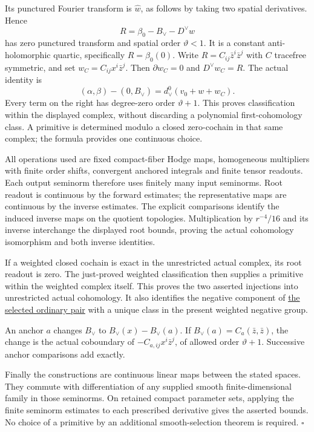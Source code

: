 \documentclass[
  english,
  11pt,
  reqno]{amsart}
\begin{document}
Its punctured Fourier transform is \(\widehat w\), as follows by taking
two spatial derivatives. Hence%
 \[
R=\beta_0-B_\vee-D^\vee w
\] has zero punctured transform and spatial order \(\vartheta<1\). It is
a constant anti-holomorphic quartic, specifically \(R=\beta_0(0)\).
Write \(R=C_{ij}\bar z^i\bar z^j\) with \(C\) tracefree symmetric, and
set \(w_C=C_{ij}x^i\bar z^j\). Then \(\partial w_C=0\) and
\(D^\vee w_C=R\). The actual identity is%
 \[
(\alpha,\beta)-(0,B_\vee)
=d_\vee^0(v_0+w+w_C).
\] Every term on the right has degree-zero order \(\vartheta+1\). This
proves classification within the displayed complex, without discarding a
polynomial first-cohomology class. A primitive is determined modulo a
closed zero-cochain in that same complex; the formula provides one
continuous choice.

All operations used are fixed compact-fiber Hodge maps, homogeneous
multipliers with finite order shifts, convergent anchored integrals and
finite tensor readouts. Each output seminorm therefore uses finitely
many input seminorms. Root readout is continuous by the forward
estimates; the representative maps are continuous by the inverse
estimates. The explicit comparisons identify the induced inverse maps on
the quotient topologies. Multiplication by \(r^{-4}/16\) and its inverse
interchange the displayed root bounds, proving the actual cohomology
isomorphism and both inverse identities.

If a weighted closed cochain is exact in the unrestricted actual
complex, its root readout is zero. The just-proved weighted
classification then supplies a primitive within the weighted complex
itself. This proves the two asserted injections into unrestricted actual
cohomology. It also identifies the negative component of
\hyperref[thm:online-canonical-actual-pair-lift]{the selected ordinary
pair} with a unique class in the present weighted negative group.

An anchor \(a\) changes \(B_\vee\) to \(B_\vee(x)-B_\vee(a)\). If
\(B_\vee(a)=C_a(\bar z,\bar z)\), the change is the actual coboundary of
\(-C_{a,ij}x^i\bar z^j\), of allowed order \(\vartheta+1\). Successive
anchor comparisons add exactly.

Finally the constructions are continuous linear maps between the stated
spaces. They commute with differentiation of any supplied smooth
finite-dimensional family in those seminorms. On retained compact
parameter sets, applying the finite seminorm estimates to each
prescribed derivative gives the asserted bounds. No choice of a
primitive by an additional smooth-selection theorem is required.
\hfill\(\square\)
\end{document}
